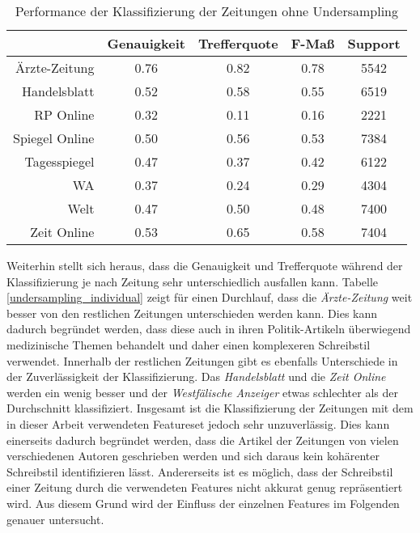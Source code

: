 \begin{table}
\centering
\begin{spacing}{1.25}
\begin{tabular}[t]{rcccc}
\toprule
~ & Genauigkeit & Trefferquote & F-Maß & Support\\
\midrule
Ärzte-Zeitung & 0.76 & 0.82 & 0.78 & 5542\\
Handelsblatt & 0.52 & 0.58 & 0.55 & 6519\\
RP Online & 0.32 & 0.11 & 0.16 & 2221\\
Spiegel Online & 0.50 & 0.56 & 0.53 & 7384\\
Tagesspiegel & 0.47 & 0.37 & 0.42 & 6122\\
WA & 0.37 & 0.24 & 0.29 & 4304\\
Welt & 0.47 & 0.50 & 0.48 & 7400\\
Zeit Online & 0.53 & 0.65 & 0.58 & 7404\\
\bottomrule
\end{tabular}
\caption{Performance der Klassifizierung der Zeitungen ohne Undersampling}
\label{no_undersampling_individual}
\end{spacing}
\end{table}

Weiterhin stellt sich heraus, dass die Genauigkeit und Trefferquote während der Klassifizierung je nach Zeitung sehr unterschiedlich ausfallen kann. Tabelle \ref{undersampling_individual} zeigt für einen Durchlauf, dass die \emph{Ärzte-Zeitung} weit besser von den restlichen Zeitungen unterschieden werden kann. Dies kann dadurch begründet werden, dass diese auch in ihren Politik-Artikeln überwiegend medizinische Themen behandelt und daher einen komplexeren Schreibstil verwendet. Innerhalb der restlichen Zeitungen gibt es ebenfalls Unterschiede in der Zuverlässigkeit der Klassifizierung. Das \emph{Handelsblatt} und die \emph{Zeit Online} werden ein wenig besser und der \emph{Westfälische Anzeiger} etwas schlechter als der Durchschnitt klassifiziert. Insgesamt ist die Klassifizierung der Zeitungen mit dem in dieser Arbeit verwendeten Featureset jedoch sehr unzuverlässig. Dies kann einerseits dadurch begründet werden, dass die Artikel der Zeitungen von vielen verschiedenen Autoren geschrieben werden und sich daraus kein kohärenter Schreibstil identifizieren lässt. Andererseits ist es möglich, dass der Schreibstil einer Zeitung durch die verwendeten Features nicht akkurat genug repräsentiert wird. Aus diesem Grund wird der Einfluss der einzelnen Features im Folgenden genauer untersucht.

